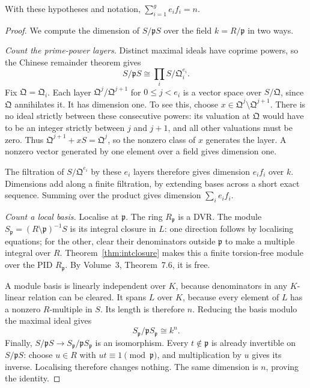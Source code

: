 \begin{theorem}\label{thm:fundid}
With these hypotheses and notation, $\displaystyle\sum_{i=1}^g e_i f_i=n$.
\end{theorem}

\begin{proof}
We compute the dimension of $S/\mathfrak pS$ over the field $k=R/\mathfrak p$ in two ways.

\emph{Count the prime-power layers.} Distinct maximal ideals have coprime powers, so the Chinese remainder theorem gives
\[
 S/\mathfrak pS\cong\prod_i S/\mathfrak Q_i^{e_i}.
\]
Fix $\mathfrak Q=\mathfrak Q_i$. Each layer $\mathfrak Q^j/\mathfrak Q^{j+1}$ for $0\le j<e_i$ is a vector space over $S/\mathfrak Q$, since $\mathfrak Q$ annihilates it. It has dimension one. To see this, choose $x\in\mathfrak Q^j\setminus\mathfrak Q^{j+1}$. There is no ideal strictly between these consecutive powers: its valuation at $\mathfrak Q$ would have to be an integer strictly between $j$ and $j+1$, and all other valuations must be zero. Thus $\mathfrak Q^{j+1}+xS=\mathfrak Q^j$, so the nonzero class of $x$ generates the layer. A nonzero vector generated by one element over a field gives dimension one.

The filtration of $S/\mathfrak Q^{e_i}$ by these $e_i$ layers therefore gives dimension $e_if_i$ over $k$. Dimensions add along a finite filtration, by extending bases across a short exact sequence. Summing over the product gives dimension $\sum_i e_if_i$.

\emph{Count a local basis.} Localise at $\mathfrak p$. The ring $R_{\mathfrak p}$ is a DVR. The module $S_{\mathfrak p}=(R\setminus\mathfrak p)^{-1}S$ is its integral closure in $L$: one direction follows by localising equations; for the other, clear their denominators outside $\mathfrak p$ to make a multiple integral over $R$. Theorem~\ref{thm:intclosure} makes this a finite torsion-free module over the PID $R_{\mathfrak p}$. By Volume~3, Theorem~7.6, it is free.

A module basis is linearly independent over $K$, because denominators in any $K$-linear relation can be cleared. It spans $L$ over $K$, because every element of $L$ has a nonzero $R$-multiple in $S$. Its length is therefore $n$. Reducing the basis modulo the maximal ideal gives
\[
 S_{\mathfrak p}/\mathfrak pS_{\mathfrak p}\cong k^n.
\]
Finally, $S/\mathfrak pS\to S_{\mathfrak p}/\mathfrak pS_{\mathfrak p}$ is an isomorphism. Every $t\notin\mathfrak p$ is already invertible on $S/\mathfrak pS$: choose $u\in R$ with $ut\equiv1\pmod{\mathfrak p}$, and multiplication by $u$ gives its inverse. Localising therefore changes nothing. The same dimension is $n$, proving the identity.
\end{proof}

